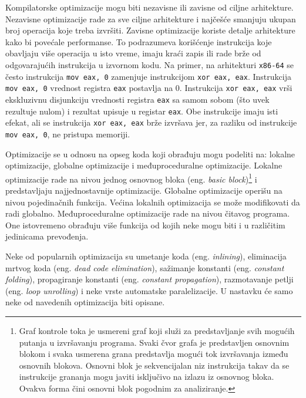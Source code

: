 \documentclass[12pt,oneside]{memoir}
\begin{document}
Kompilatorske optimizacije mogu biti nezavisne ili zavisne od ciljne arhitekture. Nezavisne optimizacije rade za sve ciljne arhitekture i najčešće smanjuju ukupan broj operacija koje treba izvršiti. Zavisne optimizacije koriste detalje arhitekture kako bi povećale performanse. To podrazumeva korišćenje instrukcija koje obavljaju više operacija u isto vreme, imaju kraći zapis ili rade brže od odgovarajućih instrukcija u izvornom kodu. Na primer, na arhitekturi \texttt{x86-64} se često instrukcija \texttt{mov eax, 0} zamenjuje instrukcijom \texttt{xor eax, eax}.
Instrukcija \texttt{mov eax, 0} vrednost registra \texttt{eax} postavlja na 0. Instrukcija \texttt{xor eax, eax} vrši ekskluzivnu disjunkciju vrednosti registra \texttt{eax} sa samom sobom (što uvek rezultuje nulom) i rezultat upisuje u registar \texttt{eax}. Obe instrukcije imaju isti efekat, ali se instrukcija \texttt{xor eax, eax} brže izvršava jer, za razliku od instrukcije \texttt{mov eax, 0}, ne pristupa memoriji.

Optimizacije se u odnosu na opseg koda koji obrađuju mogu podeliti na: lokalne 
optimizacije, globalne optimizacije i međuproceduralne optimizacije.
Lokalne optimizacije rade na nivou jednog osnovnog bloka (eng. \textit{basic block})\footnote{Graf kontrole toka je usmereni graf koji služi za predstavljanje svih mogućih putanja u izvršavanju programa. Svaki čvor grafa je predstavljen osnovnim blokom i svaka usmerena grana predstavlja mogući tok izvršavanja između osnovnih blokova. Osnovni blok je sekvencijalan niz instrukcija takav da se instrukcije grananja mogu javiti isključivo na izlazu iz osnovnog bloka. Ovakva forma čini osnovni blok pogodnim za analiziranje.} i predstavljaju najjednostavnije optimizacije. Globalne optimizacije operišu na nivou pojedinačnih funkcija. Većina lokalnih optimizacija se može modifikovati da radi globalno. Međuproceduralne optimizacije rade na nivou čitavog programa. One istovremeno obrađuju više funkcija od kojih neke mogu biti i u različitim jedinicama prevođenja.

Neke od popularnih optimizacija su umetanje koda (eng. \textit{inlining}), eliminacija mrtvog koda (eng. \textit{dead code elimination}), sažimanje konstanti (eng. \textit{constant folding}), propagiranje konstanti (eng. \textit{constant propagation}), razmotavanje petlji (eng. \textit{loop unrolling}) i neke vrste automatske paralelizacije. U nastavku će samo neke od navedenih optimizacija biti opisane.
\end{document}
